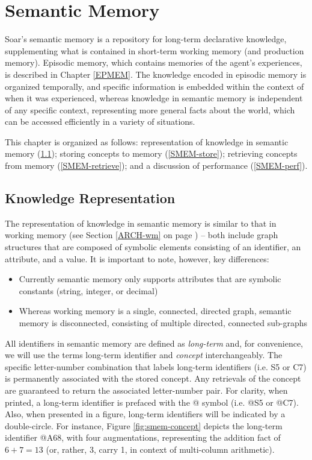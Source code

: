 \chapter{Semantic Memory}
\label{SMEM}

Soar's semantic memory is a repository for long-term declarative knowledge, supplementing what is contained in short-term working memory (and production memory). Episodic memory, which contains memories of the agent's experiences, is described in Chapter \ref{EPMEM}. The knowledge encoded in episodic memory is organized temporally, and specific information is embedded within the context of when it was experienced, whereas knowledge in semantic memory is independent of any specific context, representing more general facts about the world, which can be accessed efficiently in a variety of situations.

This chapter is organized as follows: representation of knowledge in semantic memory (\ref{SMEM-kr}); storing concepts to memory (\ref{SMEM-store}); retrieving concepts from memory (\ref{SMEM-retrieve}); and a discussion of performance (\ref{SMEM-perf}).

\section{Knowledge Representation}
\label{SMEM-kr}

The representation of knowledge in semantic memory is similar to that in working memory (see Section \ref{ARCH-wm} on page \pageref{ARCH-wm}) -- both include graph structures that are composed of symbolic elements consisting of an identifier, an attribute, and a value. It is important to note, however, key differences:

\begin{itemize}

\item Currently semantic memory only supports attributes that are symbolic constants (string, integer, or decimal)

\item Whereas working memory is a single, connected, directed graph, semantic memory is disconnected, consisting of multiple directed, connected sub-graphs

\end{itemize}

All identifiers in semantic memory are defined as \emph{long-term} and, for convenience, we will use the terms long-term identifier and \emph{concept} interchangeably. The specific letter-number combination that labels long-term identifiers (i.e. S5 or C7) is permanently associated with the stored concept.  Any retrievals of the concept are guaranteed to return the associated letter-number pair.  For clarity, when printed, a long-term identifier is prefaced with the {@} symbol (i.e. {@}S5 or {@}C7). Also, when presented in a figure, long-term identifiers will be indicated by a double-circle. For instance, Figure \ref{fig:smem-concept} depicts the long-term identifier {@}A68, with four augmentations, representing the addition fact of ${6+7=13}$ (or, rather, 3, carry 1, in context of multi-column arithmetic).

